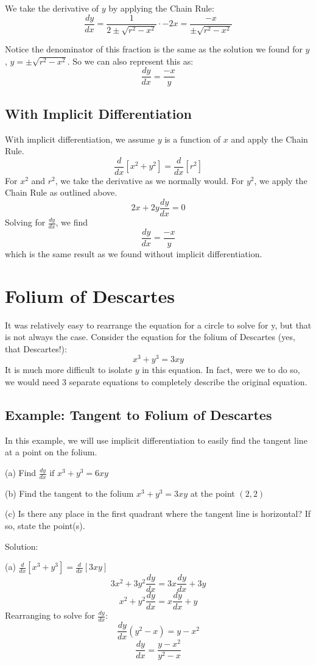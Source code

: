 We take the derivative of $y$ by applying the Chain Rule:
$$\frac{dy}{dx}=\frac{1}{2\pm \sqrt{r^2-x^2}}\cdot -2x = \frac{-x}{\pm \sqrt{r^2-x^2}}$$ 

Notice the denominator of this fraction is the same as the solution we found for $y$, $y=\pm \sqrt{r^2-x^2}$. So we can also represent this as: $$\frac{dy}{dx}=\frac{-x}{y}$$

\subsection{With Implicit Differentiation}
With implicit differentiation, we assume $y$ is a function of $x$ and apply the Chain Rule. $$\frac{d}{dx}[x^2+y^2]=\frac{d}{dx}[r^2]$$ For $x^2$ and $r^2$, we take the derivative as we normally would. For $y^2$, we apply the Chain Rule as outlined above. $$2x+2y\frac{dy}{dx}=0$$ Solving for $\frac{dy}{dx}$, we find $$\frac{dy}{dx}=\frac{-x}{y}$$ which is the same result as we found without implicit differentiation. 

\section{Folium of Descartes}
It was relatively easy to rearrange the equation for a circle to solve for y, but that is not always the case. Consider the equation for the folium of Descartes (yes, that Descartes!): $$x^3+y^3=3xy$$ It is much more difficult to isolate $y$ in this equation. In fact, were we to do so, we would need 3 separate equations to completely describe the original equation. 

\subsection{Example: Tangent to Folium of Descartes}

In this example, we will use implicit differentiation to easily find the tangent line at a point on the folium. 

(a) Find $\frac{dy}{dx} \text{ if } x^3+y^3 = 6xy$

(b) Find the tangent to the folium $x^3+y^3=3xy$ at the point $(2, 2)$

(c) Is there any place in the first quadrant where the tangent line is horizontal? If so, state the point(s). 

Solution:

(a) $\frac{d}{dx}[x^3+y^3]=\frac{d}{dx}[3xy]$
$$3x^2+3y^2\frac{dy}{dx}=3x\frac{dy}{dx}+3y$$
$$x^2+y^2\frac{dy}{dx}=x\frac{dy}{dx}+y$$
Rearranging to solve for $\frac{dy}{dx}$:
$$\frac{dy}{dx}(y^2-x)=y-x^2$$
$$\frac{dy}{dx}=\frac{y-x^2}{y^2-x}$$

